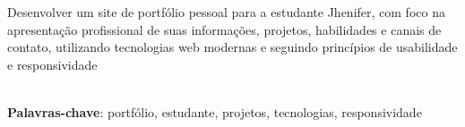 \begin{thesisresumo}
Desenvolver um site de portfólio pessoal para a
 estudante Jhenifer, com foco na apresentação
 profissional de suas informações, projetos,
 habilidades e canais de contato, utilizando
 tecnologias web modernas e seguindo princípios
 de usabilidade e responsividade

\ \\


\textbf{Palavras-chave}: portfólio, estudante, projetos, tecnologias, responsividade

\end{thesisresumo}
